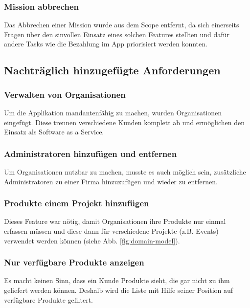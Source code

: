 \subsubsection{Mission abbrechen}

Das Abbrechen einer Mission wurde aus dem Scope entfernt, da sich einerseits Fragen über den sinvollen Einsatz eines solchen Features stellten und dafür andere Tasks wie die Bezahlung im App priorisiert werden konnten.

\subsection{Nachträglich hinzugefügte Anforderungen}

\subsubsection{Verwalten von Organisationen}

Um die Applikation mandantenfähig zu machen, wurden Organisationen eingefügt. Diese trennen verschiedene Kunden komplett ab und ermöglichen den Einsatz als Software as a Service.

\subsubsection{Administratoren hinzufügen und entfernen}

Um Organisationen nutzbar zu machen, musste es auch möglich sein, zusätzliche Administratoren zu einer Firma hinzuzufügen und wieder zu entfernen.

\subsubsection{Produkte einem Projekt hinzufügen}

Dieses Feature war nötig, damit Organisationen ihre Produkte nur einmal erfassen müssen und diese dann für verschiedene Projekte (z.B. Events) verwendet werden können (siehe Abb. \ref{fig:domain-model}).

\subsubsection{Nur verfügbare Produkte anzeigen}

Es macht keinen Sinn, dass ein Kunde Produkte sieht, die gar nicht zu ihm geliefert werden können. Deshalb wird die Liste mit Hilfe seiner Position auf verfügbare Produkte gefiltert.

